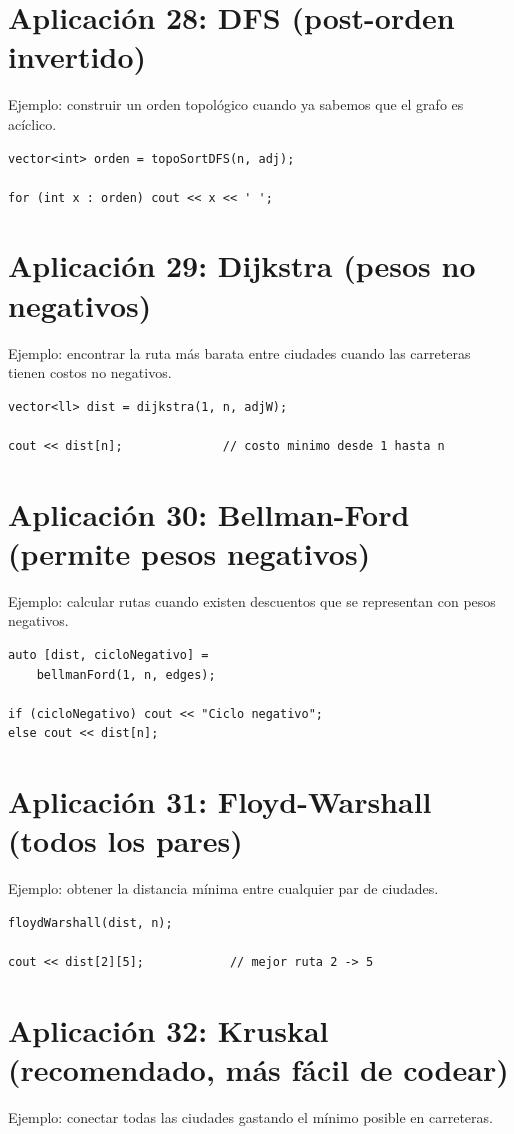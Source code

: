 \documentclass[10pt,twocolumn,letterpaper]{report}
\begin{document}
\section{Aplicación 28: DFS (post-orden invertido)}
Ejemplo: construir un orden topológico cuando ya sabemos que el grafo es acíclico.

\begin{lstlisting}
vector<int> orden = topoSortDFS(n, adj);

for (int x : orden) cout << x << ' ';
\end{lstlisting}

\section{Aplicación 29: Dijkstra (pesos no negativos)}
Ejemplo: encontrar la ruta más barata entre ciudades cuando las carreteras tienen costos no negativos.

\begin{lstlisting}
vector<ll> dist = dijkstra(1, n, adjW);

cout << dist[n];              // costo minimo desde 1 hasta n
\end{lstlisting}

\section{Aplicación 30: Bellman-Ford (permite pesos negativos)}
Ejemplo: calcular rutas cuando existen descuentos que se representan con pesos negativos.

\begin{lstlisting}
auto [dist, cicloNegativo] =
    bellmanFord(1, n, edges);

if (cicloNegativo) cout << "Ciclo negativo";
else cout << dist[n];
\end{lstlisting}

\section{Aplicación 31: Floyd-Warshall (todos los pares)}
Ejemplo: obtener la distancia mínima entre cualquier par de ciudades.

\begin{lstlisting}
floydWarshall(dist, n);

cout << dist[2][5];            // mejor ruta 2 -> 5
\end{lstlisting}

\section{Aplicación 32: Kruskal (recomendado, más fácil de codear)}
Ejemplo: conectar todas las ciudades gastando el mínimo posible en carreteras.
\end{document}
